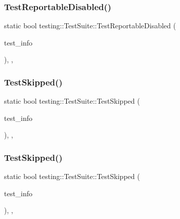 \subsubsection{\texorpdfstring{TestReportableDisabled()}{TestReportableDisabled()}\hspace{0.1cm}{\footnotesize\ttfamily [2/2]}}
{\footnotesize\ttfamily static bool testing\+::\+Test\+Suite\+::\+Test\+Reportable\+Disabled (\begin{DoxyParamCaption}\item[{const \mbox{\hyperlink{classtesting_1_1_test_info}{Test\+Info}} $\ast$}]{test\+\_\+info }\end{DoxyParamCaption})\hspace{0.3cm}{\ttfamily [inline]}, {\ttfamily [static]}, {\ttfamily [private]}}

\mbox{\label{classtesting_1_1_test_suite_a0e162a1f49f40049a5b16fe989dc75e7}} 
\subsubsection{\texorpdfstring{TestSkipped()}{TestSkipped()}\hspace{0.1cm}{\footnotesize\ttfamily [1/2]}}
{\footnotesize\ttfamily static bool testing\+::\+Test\+Suite\+::\+Test\+Skipped (\begin{DoxyParamCaption}\item[{const \mbox{\hyperlink{classtesting_1_1_test_info}{Test\+Info}} $\ast$}]{test\+\_\+info }\end{DoxyParamCaption})\hspace{0.3cm}{\ttfamily [inline]}, {\ttfamily [static]}, {\ttfamily [private]}}

\mbox{\label{classtesting_1_1_test_suite_a0e162a1f49f40049a5b16fe989dc75e7}} 
\subsubsection{\texorpdfstring{TestSkipped()}{TestSkipped()}\hspace{0.1cm}{\footnotesize\ttfamily [2/2]}}
{\footnotesize\ttfamily static bool testing\+::\+Test\+Suite\+::\+Test\+Skipped (\begin{DoxyParamCaption}\item[{const \mbox{\hyperlink{classtesting_1_1_test_info}{Test\+Info}} $\ast$}]{test\+\_\+info }\end{DoxyParamCaption})\hspace{0.3cm}{\ttfamily [inline]}, {\ttfamily [static]}, {\ttfamily [private]}}

